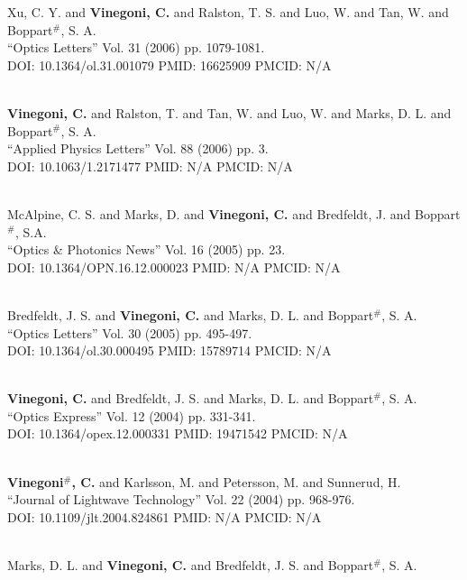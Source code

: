 Xu, C. Y. and {\bf Vinegoni, C.} and Ralston, T. S. and Luo, W. and Tan, W. and Boppart$^\#$, S. A. \\ ``Optics Letters'' Vol. 31 (2006) pp. 1079-1081. \\ DOI: 10.1364/ol.31.001079 PMID: 16625909 PMCID: N/A\item {} \\ {\bf Vinegoni, C.} and Ralston, T. and Tan, W. and Luo, W. and Marks, D. L. and Boppart$^\#$, S. A. \\ ``Applied Physics Letters'' Vol. 88 (2006) pp. 3. \\ DOI: 10.1063/1.2171477 PMID: N/A PMCID: N/A\item {} \\ McAlpine, C. S. and Marks, D. and {\bf Vinegoni, C.} and Bredfeldt, J. and Boppart$^\#$, S.A. \\ ``Optics & Photonics News'' Vol. 16 (2005) pp. 23. \\ DOI: 10.1364/OPN.16.12.000023 PMID: N/A PMCID: N/A\item {} \\ Bredfeldt, J. S. and {\bf Vinegoni, C.} and Marks, D. L. and Boppart$^\#$, S. A. \\ ``Optics Letters'' Vol. 30 (2005) pp. 495-497. \\ DOI: 10.1364/ol.30.000495 PMID: 15789714 PMCID: N/A\item {} \\ {\bf Vinegoni, C.} and Bredfeldt, J. S. and Marks, D. L. and Boppart$^\#$, S. A. \\ ``Optics Express'' Vol. 12 (2004) pp. 331-341. \\ DOI: 10.1364/opex.12.000331 PMID: 19471542 PMCID: N/A\item {} \\ {\bf Vinegoni$^\#$, C.} and Karlsson, M. and Petersson, M. and Sunnerud, H. \\ ``Journal of Lightwave Technology'' Vol. 22 (2004) pp. 968-976. \\ DOI: 10.1109/jlt.2004.824861 PMID: N/A PMCID: N/A\item {} \\ Marks, D. L. and {\bf Vinegoni, C.} and Bredfeldt, J. S. and Boppart$^\#$, S. A. 